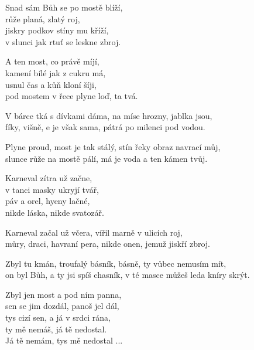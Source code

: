 
\ve{}
Snad sám Bůh se po mostě blíží, \\
růže planá, zlatý roj, \\
jiskry podkov stíny mu kříží, \\
v slunci jak rtuť se leskne zbroj.

\ve{}
A ten most, co právě míjí, \\
kamení bílé jak z cukru má, \\
usnul čas a kůň kloní šíji, \\
pod mostem v řece plyne loď, ta tvá.

\re{*}
V bárce tká s dívkami dáma, na míse hrozny, jablka jsou, \\
fíky, višně, e je však sama, pátrá po milenci pod vodou.

\re{*}
Plyne proud, most je tak stálý, stín řeky obraz navrací můj, \\
slunce růže na mostě pálí, má je voda a ten kámen tvůj.

\ve{}
Karneval zítra už začne, \\
v tanci masky ukryjí tvář, \\
páv a orel, hyeny lačné, \\
nikde láska, nikde svatozář.

\re{*}
Karneval začal už včera, vířil marně v ulicích roj, \\
můry, draci, havraní pera, nikde onen, jemuž jiskří zbroj.

\re{*}
Zbyl tu kmán, troufalý básník, básně, ty vůbec nemusím mít, \\
on byl Bůh, a ty jsi spíš chasník, v té masce můžeš leda kníry skrýt.

\ve{}
Zbyl jen most a pod ním panna, \\
sen se jim dozdál, panoš jel dál, \\
tys cizí sen, a já v srdci rána, \\
ty mě nemáš, já tě nedostal. \\

Já tě nemám, tys mě nedostal ...

\esong